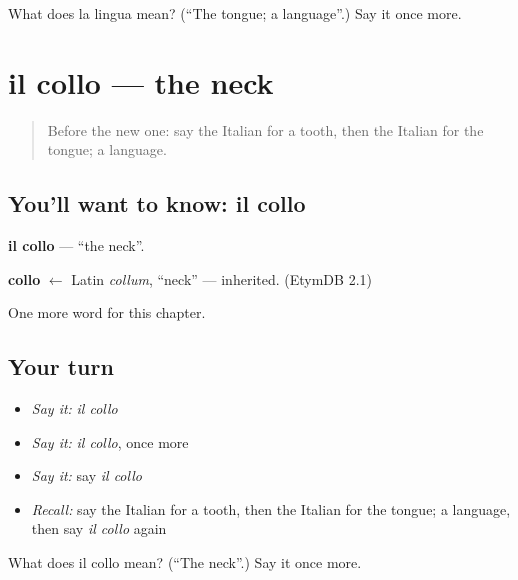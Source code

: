 \begin{tcolorbox}[breakable,colback=teal!4,colframe=teal!35!black,title={Before you move on}]
What does la lingua mean? (\textquotedblleft{}The tongue; a language\textquotedblright{}.) Say it once more.
\end{tcolorbox}
\section[il collo]{il collo — the neck}

\label{lesson:IT-C38-collo}



\begin{quote}
Before the new one: say the Italian for a tooth, then the Italian for the tongue; a language.
\end{quote}

\subsection*{You'll want to know: il collo}
\textbf{il collo} — \textquotedblleft{}the neck\textquotedblright{}.

\begin{cousinweb}
\textbf{collo} $\leftarrow$ Latin \emph{collum}, \textquotedblleft{}neck\textquotedblright{} — inherited. (EtymDB 2.1)
\end{cousinweb}

\begin{grammarlens}[title={What you've built}]
One more word for this chapter.
\end{grammarlens}

\subsection*{Your turn}
\begin{itemize}
\raggedright
  \item \emph{Say it:} \emph{il collo}
  \item \emph{Say it:} \emph{il collo}, once more
  \item \emph{Say it:} say \emph{il collo}
  \item \emph{Recall:} say the Italian for a tooth, then the Italian for the tongue; a language, then say \emph{il collo} again
\end{itemize}

\begin{tcolorbox}[breakable,colback=teal!4,colframe=teal!35!black,title={Before you move on}]
What does il collo mean? (\textquotedblleft{}The neck\textquotedblright{}.) Say it once more.
\end{tcolorbox}
